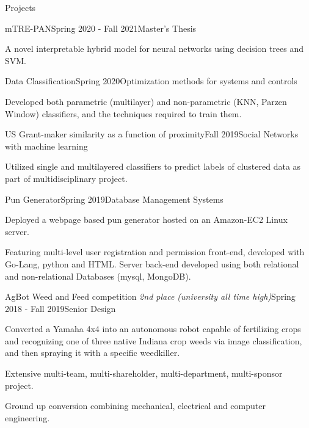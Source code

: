 \documentclass{resume}
\begin{document}
% 
% 
\begin{rSection}{Projects}

\begin{rSubsection}{mTRE-PAN}{Spring 2020 - Fall 2021}{{Master's Thesis}}{}
    \item A novel interpretable hybrid model for neural networks using decision trees and SVM.
\end{rSubsection}


\begin{rSubsection}{Data Classification}{Spring 2020}{{Optimization methods for systems and controls}}{}
    \item Developed both parametric (multilayer) and non-parametric (KNN, Parzen Window) classifiers, and the techniques required to train them.
\end{rSubsection}

\begin{rSubsection}{US Grant-maker similarity as a function of proximity}{Fall 2019}{{Social Networks with machine learning}}{}
    \item Utilized single and multilayered classifiers to predict labels of clustered data as part of multidisciplinary project.
\end{rSubsection}

\begin{rSubsection}{Pun Generator}{Spring 2019}{{Database Management Systems}}{}
    \item Deployed a webpage based pun generator hosted on an Amazon-EC2 Linux server.
    \item Featuring multi-level user registration and permission front-end, developed with Go-Lang, python and HTML. Server back-end developed using both relational and non-relational Databases (mysql, MongoDB).
\end{rSubsection}

\begin{rSubsection}{AgBot Weed and Feed competition \emph{2nd place (university all time high)}}{Spring 2018 - Fall 2019}{{Senior Design}}{}
    \item Converted a Yamaha 4x4 into an autonomous robot capable of fertilizing crops and recognizing one of three native Indiana crop weeds via image classification, and then spraying it with a specific weedkiller.
    \item Extensive multi-team, multi-shareholder, multi-department, multi-sponsor project.
    \item Ground up conversion combining mechanical, electrical and computer engineering.
\end{rSubsection}


\end{rSection}
\end{document}
